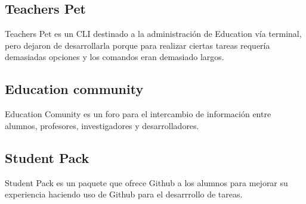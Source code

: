 \subsection{Teachers Pet}
Teachers Pet es un CLI destinado a la administración de Education vía terminal, pero dejaron de desarrollarla porque para realizar ciertas tareas requería demasiadas opciones y los comandos eran demasiado largos.

\subsection{Education community}
Education Comunity es un foro para el intercambio de información entre alumnos, profesores, investigadores y desarrolladores.

\subsection{Student Pack}
Student Pack \cite{B15} es un paquete que ofrece Github a los alumnos para
mejorar su experiencia haciendo uso de Github para el desarrrollo
de tareas.
